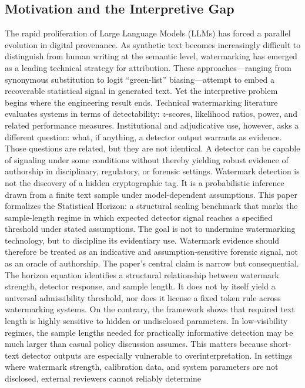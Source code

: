 \documentclass[11pt]{article}
\begin{document}
\subsection{Motivation and the Interpretive Gap}
The rapid proliferation of Large Language Models (LLMs) has forced a parallel
evolution in digital provenance. As synthetic text becomes increasingly difficult
to distinguish from human writing at the semantic level, watermarking has emerged
as a leading technical strategy for attribution. These approaches---ranging from
synonymous substitution to logit ``green-list'' biasing---attempt to embed a
recoverable statistical signal in generated text.
Yet the interpretive problem begins where the engineering result ends. Technical
watermarking literature evaluates systems in terms of detectability: $z$-scores,
likelihood ratios, power, and related performance measures. Institutional and
adjudicative use, however, asks a different question: what, if anything, a
detector output warrants as evidence. Those questions are related, but they are
not identical. A detector can be capable of signaling under some conditions
without thereby yielding robust evidence of authorship in disciplinary,
regulatory, or forensic settings.
Watermark detection is not the discovery of a hidden cryptographic tag. It is a
probabilistic inference drawn from a finite text sample under model-dependent
assumptions. This paper formalizes the Statistical Horizon: a structural scaling
benchmark that marks the sample-length regime in which expected detector signal
reaches a specified threshold under stated assumptions. The goal is not to
undermine watermarking technology, but to discipline its evidentiary use.
Watermark evidence should therefore be treated as an indicative and
assumption-sensitive forensic signal, not as an oracle of authorship.
The paper's central claim is narrow but consequential. The horizon equation
identifies a structural relationship between watermark strength, detector
response, and sample length. It does not by itself yield a universal admissibility
threshold, nor does it license a fixed token rule across watermarking systems. On
the contrary, the framework shows that required text length is highly sensitive to
hidden or undisclosed parameters. In low-visibility regimes, the sample lengths
needed for practically informative detection may be much larger than casual policy
discussion assumes.
This matters because short-text detector outputs are especially vulnerable to
overinterpretation. In settings where watermark strength, calibration data, and
system parameters are not disclosed, external reviewers cannot reliably determine
\end{document}

